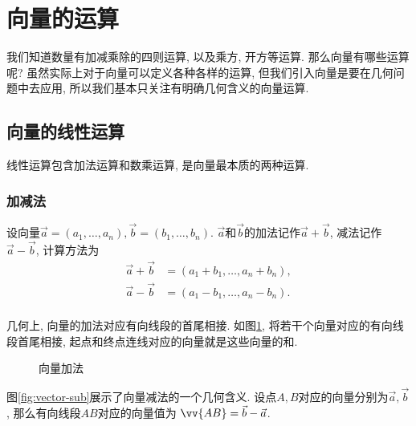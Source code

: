 \section{向量的运算} \label{sec:vec-calc}

我们知道数量有加减乘除的四则运算, 以及乘方, 开方等运算.
那么向量有哪些运算呢?
虽然实际上对于向量可以定义各种各样的运算,
但我们引入向量是要在几何问题中去应用,
所以我们基本只关注有明确几何含义的向量运算.

\subsection{向量的线性运算}

线性运算包含加法运算和数乘运算, 是向量最本质的两种运算.

\subsubsection{加减法}

设向量$\vec{a}=(a_1,\dots,a_n),\vec{b}=(b_1,\dots,b_n)$.
$\vec{a}$和$\vec{b}$的加法记作$\vec{a}+\vec{b}$,
减法记作$\vec{a}-\vec{b}$, 计算方法为
\begin{align*}
  \vec{a}+\vec{b} & = (a_1+b_1,\dots,a_n+b_n), \\
  \vec{a}-\vec{b} & = (a_1-b_1,\dots,a_n-b_n). \\
\end{align*}

几何上, 向量的加法对应有向线段的首尾相接.
如图\ref{fig:vector-add},
将若干个向量对应的有向线段首尾相接,
起点和终点连线对应的向量就是这些向量的和.

\begin{figure}[htbp]
  \centering
  \caption{向量加法}
  \label{fig:vector-add}
\end{figure}

图\ref{fig:vector-sub}展示了向量减法的一个几何含义.
设点$A,B$对应的向量分别为$\vec{a},\vec{b}$,
那么有向线段$AB$对应的向量值为
$\vv{AB} = \vec{b} - \vec{a}$.

